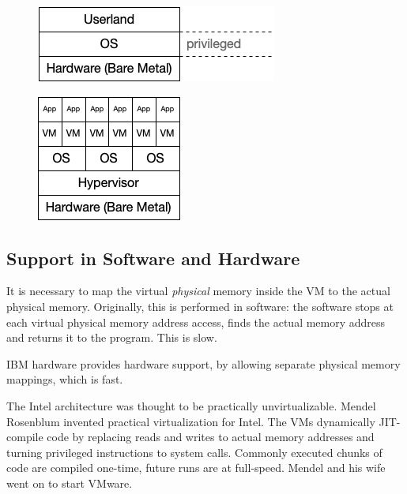 \documentclass[twoside]{article}
\begin{document}
\begin{figure}
\centering
\begin{minipage}{.6\textwidth}
  \centering
  \includegraphics[width=.7\linewidth]{architecture-prev}
  \label{fig:architecture-prev}
\end{minipage}%
\begin{minipage}{.4\textwidth}
  \centering
  \includegraphics[width=.6\linewidth]{architecture-now}
  \label{fig:architecture-now}
\end{minipage}
\end{figure}

\subsection{Support in Software and Hardware}

It is necessary to map the virtual \textit{physical} memory inside the VM to the actual physical memory. Originally, this is performed in software: the software stops at each virtual physical memory address access, finds the actual memory address and returns it to the program. This is slow.

IBM hardware provides hardware support, by allowing separate physical memory mappings, which is fast.

The Intel architecture was thought to be practically unvirtualizable. Mendel Rosenblum invented practical virtualization for Intel. The VMs dynamically JIT-compile code by replacing reads and writes to actual memory addresses and turning privileged instructions to system calls. Commonly executed chunks of code are compiled one-time, future runs are at full-speed. Mendel and his wife went on to start VMware.
\end{document}
